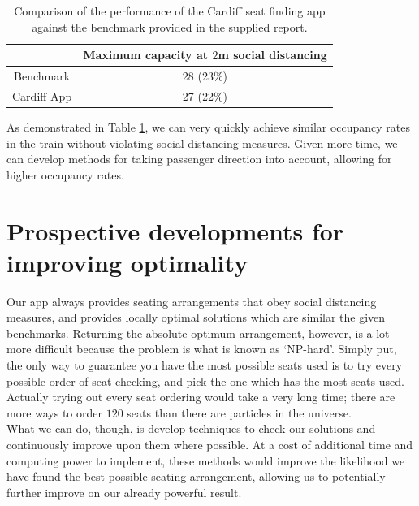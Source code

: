 \documentclass[11pt,a4paper]{article}
\begin{document}
\begin{table}[ht!]
\begin{center}
 \begin{tabular}{|c |c|}
 \hline
& \textbf{Maximum capacity at $2$m social distancing }\\
 \hline
 Benchmark &   28 (23\%)\\
 \hline
 Cardiff App  & 27 (22\%)\\
\hline
\end{tabular}
\end{center}
\caption{Comparison of the performance of the Cardiff seat finding app against the benchmark provided in the supplied report.}
\label{tab:performance}
\end{table}


As demonstrated in Table \ref{tab:performance}, we can very quickly achieve similar occupancy rates in the train without violating social distancing measures. Given more time, we can develop methods for taking passenger direction into account, allowing for higher occupancy rates.

\section*{Prospective developments for improving optimality}
Our app always provides seating arrangements that obey social distancing measures, and provides locally optimal solutions which are similar the given benchmarks. Returning the  absolute optimum arrangement, however, is a lot more difficult because the problem is what is known as `NP-hard'.  Simply put, the only way to guarantee you have the most possible seats used is to try every possible order of seat checking, and pick the one which has the most seats used. Actually trying out every seat ordering would take a very long time; there are more ways to order $120$ seats than there are particles in the universe.\\

What we can do, though, is develop techniques to check our solutions and continuously improve upon them where possible. At a cost of additional time and computing power to implement, these methods would improve the likelihood we have found the best possible seating arrangement, allowing us to potentially further improve on our already powerful result.\\
\end{document}

